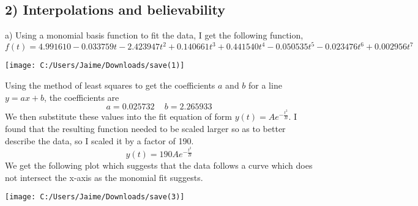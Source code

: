 \documentclass[12pt, oneside]{article}
\begin{document}
\subsection*{2) Interpolations and believability}
a) Using a monomial basis function to fit the data, I get the following function,
\[f(t) = 4.991610-0.033759t-2.423947t^2+0.140661t^3+0.441540t^4-0.050535t^5-0.023476t^6+0.002956t^7\]
\begin{center}
\texttt{[image: C:/Users/Jaime/Downloads/save(1)]}
\end{center}

Using the method of least squares to get the coefficients $a$ and $b$ for a line $y=ax + b$, the coefficients are
\[a=0.025732\,\,\,\,\,\,\, b=2.265933\]
We then substitute these values into the fit equation of form $y(t) = Ae^{-\frac{t^2}{B}} $. I found that the resulting function needed to be scaled larger so as to better describe the data, so I scaled it by a factor of 190.
\[y(t) = 190Ae^{-\frac{t^2}{B}}\]
We get the following plot which suggests that the data follows a curve which does not intersect the x-axis as the monomial fit suggests. 
\begin{center}
\texttt{[image: C:/Users/Jaime/Downloads/save(3)]}
\end{center}
\end{document}
